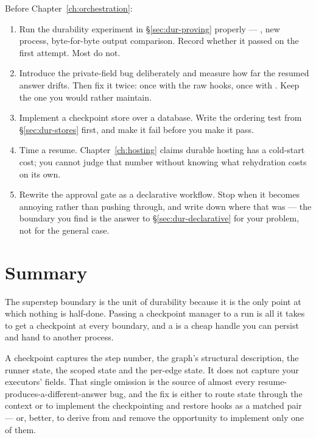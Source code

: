 \begin{exercisebox}
Before Chapter~\ref{ch:orchestration}:

\begin{enumerate}[leftmargin=1.4em]
\item Run the durability experiment in \S\ref{sec:dur-proving} properly ---
      , new process, byte-for-byte output comparison. Record
      whether it passed on the first attempt. Most do not.
\item Introduce the private-field bug deliberately and measure how far the
      resumed answer drifts. Then fix it twice: once with the raw hooks, once
      with . Keep the one you would rather maintain.
\item Implement a checkpoint store over a database. Write the ordering test
      from \S\ref{sec:dur-stores} first, and make it fail before you make it
      pass.
\item Time a resume. Chapter~\ref{ch:hosting} claims durable hosting has a
      cold-start cost; you cannot judge that number without knowing what
      rehydration costs on its own.
\item Rewrite the approval gate as a declarative workflow. Stop when it becomes
      annoying rather than pushing through, and write down where that was ---
      the boundary you find is the answer to \S\ref{sec:dur-declarative} for
      your problem, not for the general case.
\end{enumerate}
\end{exercisebox}

\section{Summary}

The superstep boundary is the unit of durability because it is the only point at
which nothing is half-done. Passing a checkpoint manager to a run is all it takes
to get a checkpoint at every boundary, and a  is a cheap
handle you can persist and hand to another process.

A checkpoint captures the step number, the graph's structural description, the
runner state, the scoped state and the per-edge state. It does not capture your
executors' fields. That single omission is the source of almost every
resume-produces-a-different-answer bug, and the fix is either to route state
through the context or to implement the checkpointing and restore hooks as a
matched pair --- or, better, to derive from  and remove the
opportunity to implement only one of them.

